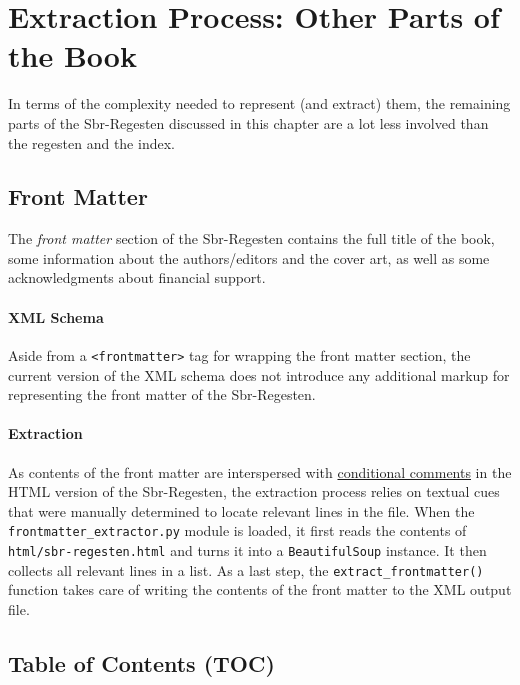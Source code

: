 \section{Extraction Process: Other Parts of the Book}

In terms of the complexity needed to represent (and extract) them, the
remaining parts of the Sbr-Regesten discussed in this chapter are a
lot less involved than the regesten and the index.

\subsection{Front Matter}
\label{sec:frontmatter}

The \emph{front matter} section of the Sbr-Regesten contains the full
title of the book, some information about the authors/editors and the
cover art, as well as some acknowledgments about financial support.

\paragraph{XML Schema}

Aside from a \texttt{<frontmatter>} tag for wrapping the front matter
section, the current version of the XML schema does not introduce any
additional markup for representing the front matter of the
Sbr-Regesten.

\paragraph{Extraction}

As contents of the front matter are interspersed with
\href{https://en.wikipedia.org/wiki/Conditional_comment}{conditional
  comments} in the HTML version of the Sbr-Regesten, the extraction
process relies on textual cues that were manually determined to locate
relevant lines in the file. When the
\texttt{frontmatter\_extractor.py} module is loaded, it first reads
the contents of \texttt{html/sbr-regesten.html} and turns it into a
\texttt{BeautifulSoup} instance. It then collects all relevant lines
in a list. As a last step, the \texttt{extract\_frontmatter()}
function takes care of writing the contents of the front matter to the
XML output file.

\subsection{Table of Contents (TOC)}
\label{sec:toc}


